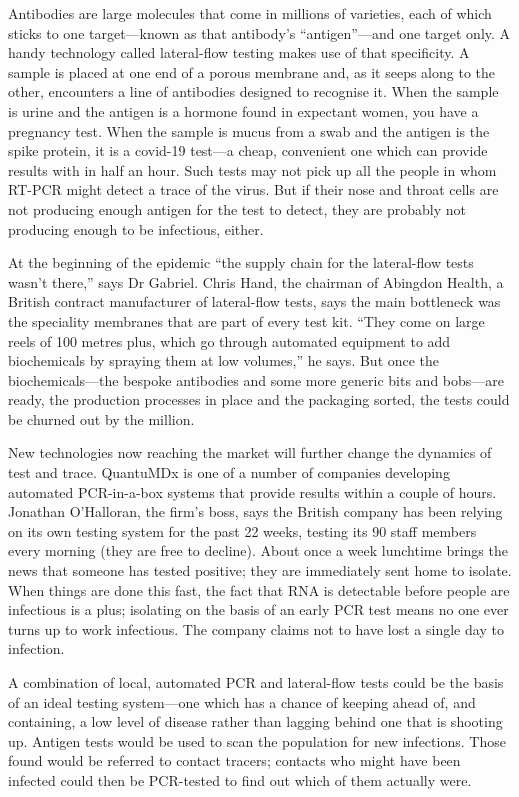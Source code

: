 \documentclass{article}
\begin{document}
Antibodies are large molecules that come in millions of varieties, each of which sticks to one target---known as that antibody's ``antigen''---and one target only. A handy technology called lateral-flow testing makes use of that specificity. A sample is placed at one end of a porous membrane and, as it seeps along to the other, encounters a line of antibodies designed to recognise it. When the sample is urine and the antigen is a hormone found in expectant women, you have a pregnancy test. When the sample is mucus from a swab and the antigen is the spike protein, it is a covid-19 test---a cheap, convenient one which can provide results with in half an hour. Such tests may not pick up all the people in whom RT-PCR might detect a trace of the virus. But if their nose and throat cells are not producing enough antigen for the test to detect, they are probably not producing enough to be infectious, either. 

At the beginning of the epidemic ``the supply chain for the lateral-flow tests wasn't there,'' says Dr Gabriel. Chris Hand, the chairman of Abingdon Health, a British contract manufacturer of lateral-flow tests, says the main bottleneck was the speciality membranes that are part of every test kit. ``They come on large reels of 100 metres plus, which go through automated equipment to add biochemicals by spraying them at low volumes,'' he says. But once the biochemicals---the bespoke antibodies and some more generic bits and bobs---are ready, the production processes in place and the packaging sorted, the tests could be churned out by the million. 

New technologies now reaching the market will further change the dynamics of test and trace. QuantuMDx is one of a number of companies developing automated PCR-in-a-box systems that provide results within a couple of hours. Jonathan O'Halloran, the firm's boss, says the British company has been relying on its own testing system for the past 22 weeks, testing its 90 staff members every morning (they are free to decline). About once a week lunchtime brings the news that someone has tested positive; they are immediately sent home to isolate. When things are done this fast, the fact that RNA is detectable before people are infectious is a plus; isolating on the basis of an early PCR test means no one ever turns up to work infectious. The company claims not to have lost a single day to infection. 

A combination of local, automated PCR and lateral-flow tests could be the basis of an ideal testing system---one which has a chance of keeping ahead of, and containing, a low level of disease rather than lagging behind one that is shooting up. Antigen tests would be used to scan the population for new infections. Those found would be referred to contact tracers; contacts who might have been infected could then be PCR-tested to find out which of them actually were. 
\end{document}
